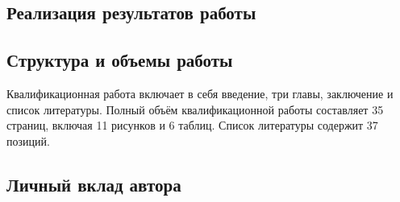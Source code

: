 
\subsection*{Реализация результатов работы}

\subsection*{Структура и объемы работы}

Квалификационная работа включает в себя введение, три главы, заключение и список литературы.
Полный объём квалификационной работы составляет 35 страниц, включая 11 рисунков и 6 таблиц.
Список литературы содержит 37 позиций.

\subsection*{Личный вклад автора}

